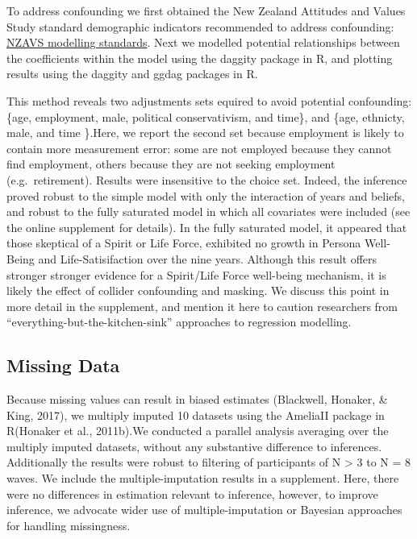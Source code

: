 \documentclass[
  english,
  man,floatsintext]{apa6}
\begin{document}
To address confounding we first obtained the New Zealand Attitudes and Values Study standard demographic indicators recommended to address confounding: \href{https://cdn.auckland.ac.nz/assets/psych/about/our-research/nzavs/NZAVSTechnicalDocuments/NZAVS-Technical-Documents-e11-Default-Statistical-Standards.pdf}{NZAVS modelling standards}. Next we modelled potential relationships between the coefficients within the model using the daggity package in R, and plotting results using the daggity and ggdag packages in R.

This method reveals two adjustments sets equired to avoid potential confounding: \{age, employment, male, political conservativism, and time\}, and \{age, ethnicty, male, and time \}.Here, we report the second set because employment is likely to contain more measurement error: some are not employed because they cannot find employment, others because they are not seeking employment (e.g.~retirement). Results were insensitive to the choice set. Indeed, the inference proved robust to the simple model with only the interaction of years and beliefs, and robust to the fully saturated model in which all covariates were included (see the online supplement for details). In the fully saturated model, it appeared that those skeptical of a Spirit or Life Force, exhibited no growth in Persona Well-Being and Life-Satisifaction over the nine years. Although this result offers stronger stronger evidence for a Spirit/Life Force well-being mechanism, it is likely the effect of collider confounding and masking. We discuss this point in more detail in the supplement, and mention it here to caution researchers from \enquote{everything-but-the-kitchen-sink} approaches to regression modelling.

\hypertarget{missing-data}{%
\subsection{Missing Data}\label{missing-data}}

Because missing values can result in biased estimates (Blackwell, Honaker, \& King, 2017), we multiply imputed 10 datasets using the AmeliaII package in R(Honaker et al., 2011b).We conducted a parallel analysis averaging over the multiply imputed datasets, without any substantive difference to inferences. Additionally the results were robust to filtering of participants of N \textgreater{} 3 to N = 8 waves.
We include the multiple-imputation results in a supplement. Here, there were no differences in estimation relevant to inference, however, to improve inference, we advocate wider use of multiple-imputation or Bayesian approaches for handling missingness.
\end{document}
